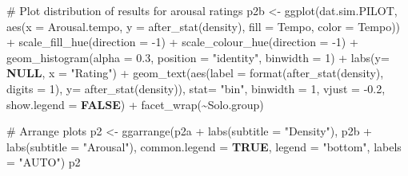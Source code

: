 \documentclass[
  bookmarksnumbered]{article}
\newenvironment{Shaded}{\begin{snugshade}}{\end{snugshade}}
\newcommand{\AttributeTok}[1]{\textcolor[rgb]{0.80,0.80,0.80}{#1}}
\newcommand{\CommentTok}[1]{\textcolor[rgb]{0.50,0.62,0.50}{#1}}
\newcommand{\ConstantTok}[1]{\textcolor[rgb]{0.86,0.64,0.64}{\textbf{#1}}}
\newcommand{\DecValTok}[1]{\textcolor[rgb]{0.86,0.86,0.80}{#1}}
\newcommand{\FloatTok}[1]{\textcolor[rgb]{0.75,0.75,0.82}{#1}}
\newcommand{\FunctionTok}[1]{\textcolor[rgb]{0.94,0.94,0.56}{#1}}
\newcommand{\NormalTok}[1]{\textcolor[rgb]{0.80,0.80,0.80}{#1}}
\newcommand{\OtherTok}[1]{\textcolor[rgb]{0.94,0.94,0.56}{#1}}
\newcommand{\SpecialCharTok}[1]{\textcolor[rgb]{0.86,0.64,0.64}{#1}}
\newcommand{\StringTok}[1]{\textcolor[rgb]{0.80,0.58,0.58}{#1}}
\begin{document}
\begin{Shaded}
\begin{Highlighting}[]
\CommentTok{\# Plot distribution of results for arousal ratings}
\NormalTok{p2b }\OtherTok{\textless{}{-}} \FunctionTok{ggplot}\NormalTok{(dat.sim.PILOT, }\FunctionTok{aes}\NormalTok{(}\AttributeTok{x =}\NormalTok{ Arousal.tempo, }\AttributeTok{y =} \FunctionTok{after\_stat}\NormalTok{(density),}
                                 \AttributeTok{fill =}\NormalTok{ Tempo, }\AttributeTok{color =}\NormalTok{ Tempo)) }\SpecialCharTok{+}
  \FunctionTok{scale\_fill\_hue}\NormalTok{(}\AttributeTok{direction =} \SpecialCharTok{{-}}\DecValTok{1}\NormalTok{) }\SpecialCharTok{+} \FunctionTok{scale\_colour\_hue}\NormalTok{(}\AttributeTok{direction =} \SpecialCharTok{{-}}\DecValTok{1}\NormalTok{) }\SpecialCharTok{+}
  \FunctionTok{geom\_histogram}\NormalTok{(}\AttributeTok{alpha =} \FloatTok{0.3}\NormalTok{, }\AttributeTok{position =} \StringTok{"identity"}\NormalTok{, }\AttributeTok{binwidth =} \DecValTok{1}\NormalTok{) }\SpecialCharTok{+}
  \FunctionTok{labs}\NormalTok{(}\AttributeTok{y=} \ConstantTok{NULL}\NormalTok{, }\AttributeTok{x =} \StringTok{"Rating"}\NormalTok{) }\SpecialCharTok{+}
  \FunctionTok{geom\_text}\NormalTok{(}\FunctionTok{aes}\NormalTok{(}\AttributeTok{label =} \FunctionTok{format}\NormalTok{(}\FunctionTok{after\_stat}\NormalTok{(density), }\AttributeTok{digits =} \DecValTok{1}\NormalTok{), }\AttributeTok{y=} \FunctionTok{after\_stat}\NormalTok{(density)), }
            \AttributeTok{stat=} \StringTok{"bin"}\NormalTok{, }\AttributeTok{binwidth =} \DecValTok{1}\NormalTok{, }
            \AttributeTok{vjust =} \SpecialCharTok{{-}}\FloatTok{0.2}\NormalTok{,}
            \AttributeTok{show.legend =} \ConstantTok{FALSE}\NormalTok{) }\SpecialCharTok{+}
  \FunctionTok{facet\_wrap}\NormalTok{(}\SpecialCharTok{\textasciitilde{}}\NormalTok{Solo.group)}

\CommentTok{\# Arrange plots}
\NormalTok{p2 }\OtherTok{\textless{}{-}} \FunctionTok{ggarrange}\NormalTok{(p2a }\SpecialCharTok{+}
                  \FunctionTok{labs}\NormalTok{(}\AttributeTok{subtitle =} \StringTok{"Density"}\NormalTok{), }
\NormalTok{                p2b  }\SpecialCharTok{+}
                  \FunctionTok{labs}\NormalTok{(}\AttributeTok{subtitle =} \StringTok{"Arousal"}\NormalTok{),}
                \AttributeTok{common.legend =} \ConstantTok{TRUE}\NormalTok{,}
                \AttributeTok{legend =} \StringTok{"bottom"}\NormalTok{,}
                \AttributeTok{labels =} \StringTok{"AUTO"}\NormalTok{)}
\NormalTok{p2}
\end{Highlighting}
\end{Shaded}
\end{document}
